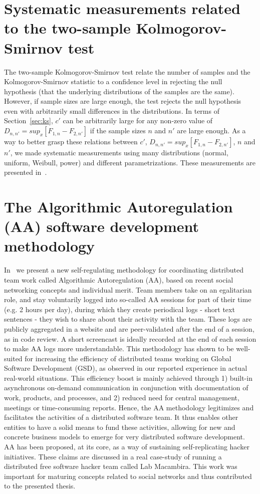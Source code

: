 \begin{apendicesenv}
\section{Systematic measurements related to the two-sample Kolmogorov-Smirnov test}
The two-sample Kolmogorov-Smirnov test relate the number of samples and the Kolmogorov-Smirnov statistic
to a confidence level in rejecting the null hypothesis (that the underlying distributions of the samples are the same).
However, if sample sizes are large enough, the test rejects the null hypothesis even with arbitrarily small differences
in the distributions.
In terms of Section~\ref{sec:ks}, $c'$ can be arbitrarily large for any non-zero value of
$D_{n,n'}=sup_x[F_{1,n}-F_{2,n'}]$
if the sample sizes $n$ and $n'$ are large enough.
As a way to better grasp these relations between 
$c'$,
$D_{n,n'}=sup_x[F_{1,n}-F_{2,n'}]$,
$n$ and $n'$, we made systematic measurements using many distributions
(normal, uniform, Weibull, power) and different parametrizations.
These measurements are presented in~\cite{kolmSmir}.

\section{The Algorithmic Autoregulation (AA) software development methodology}\label{sec:aa}
In~\cite{aaPaper} we present a new self-regulating methodology for coordinating distributed team work called Algorithmic Autoregulation (AA),
based on recent social networking concepts and individual merit.
Team members take on an egalitarian role, and stay voluntarily logged into so-called AA sessions for part of their time 
(e.g. 2 hours per day), during which they create periodical logs - short text sentences - 
they wish to share about their activity with the team.
These logs are publicly aggregated in a website and are peer-validated after the end of a session,
as in code review. 
A short screencast is ideally recorded at the end of each session to make AA logs more understandable.
This methodology has shown to be well-suited for increasing the efficiency of distributed teams working on 
Global Software Development (GSD), as observed in our reported experience in actual real-world situations.
This efficiency boost is mainly achieved through 1) built-in asynchronous on-demand communication in 
conjunction with documentation of work, products, and processes, and 2) reduced need for central management,
meetings or time-consuming reports.
Hence, the AA methodology legitimizes and facilitates the activities of a distributed software team.
It thus enables other entities to have a solid means to fund these activities, 
allowing for new and concrete business models to emerge for very distributed software development. 
AA has been proposed, at its core, as a way of sustaining self-replicating hacker initiatives.
These claims are discussed in a real case-study of running a distributed free software hacker team called Lab Macambira.
This work was important for maturing concepts related to social networks and thus contributed to the presented thesis.


\end{apendicesenv}
